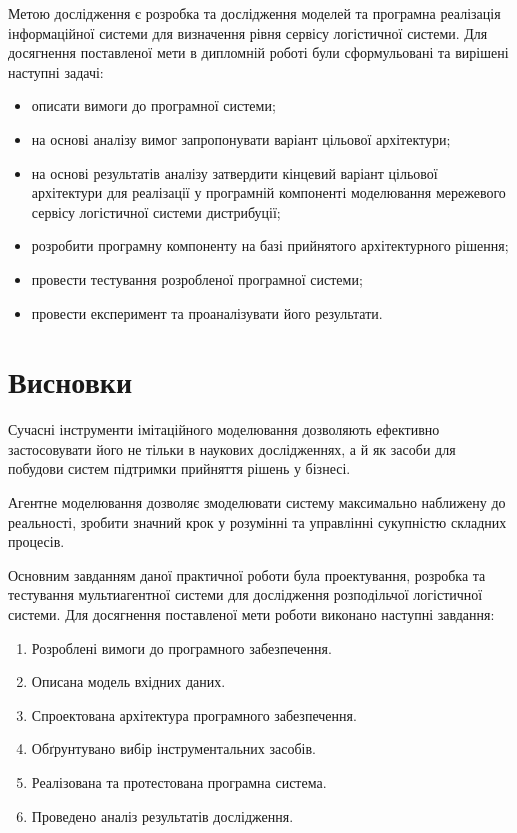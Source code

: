Метою дослідження є розробка та дослідження моделей та програмна реалізація інформаційної системи для визначення рівня сервісу логістичної системи.
Для досягнення поставленої мети в дипломній роботі були сформульовані та вирішені наступні задачі:
\begin{itemize}
	\item описати вимоги до програмної системи;
	\item на основі аналізу вимог запропонувати варіант цільової архітектури;
	\item на основі результатів аналізу затвердити кінцевий варіант цільової архітектури для реалізації у програмній компоненті моделювання мережевого сервісу логістичної системи дистрибуції;
	\item розробити програмну компоненту на базі прийнятого архітектурного рішення;
	\item провести тестування розробленої програмної системи;
	\item провести експеримент та проаналізувати його результати.
\end{itemize}




\section*{Висновки}
Сучасні інструменти імітаційного моделювання дозволяють ефективно застосовувати його не тільки в наукових дослідженнях, а й як засоби для побудови систем підтримки прийняття рішень у бізнесі. 

Агентне моделювання дозволяє змоделювати систему максимально наближену до реальності, зробити значний крок у розумінні та управлінні сукупністю складних процесів.

Основним завданням даної практичної роботи була проектування, розробка та тестування мультиагентної системи для дослідження розподільчої логістичної системи.
Для досягнення поставленої мети роботи виконано наступні завдання:
\begin{enumerate}
    \item Розроблені вимоги до програмного забезпечення.
    \item Описана модель вхідних даних. 
    \item Спроектована архітектура програмного забезпечення. 
    \item Обґрунтувано вибір інструментальних засобів.
    \item Реалізована та протестована програмна система. 
    \item Проведено аналіз результатів дослідження. 
\end{enumerate}




